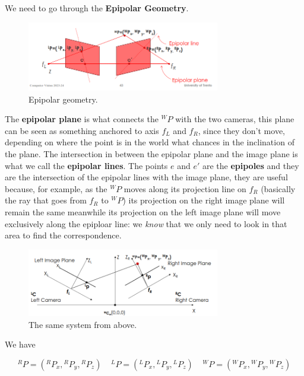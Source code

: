 We need to go through the \textbf{Epipolar Geometry}.

\begin{figure}[H]
    \centering
    \includegraphics[width=0.75\textwidth]{Figures/epipolar.png}
    \caption{Epipolar geometry.}
    \label{fig:epipolar}
\end{figure}

The \textbf{epipolar plane} is what connects the  \({}^WP\) with the two cameras, this plane can be seen as something anchored to axis \(f_L\) and \(f_R\), since they don't move, depending on where the point is in the world what chances in the inclination of the plane. The intersection in between the epipolar plane and the image plane is what we call the \textbf{epipolar lines}. The points \(e\) and \(e'\) are the \textbf{epipoles} and they are the intersection of the epipolar lines with the image plane, they are useful because, for example, as the \({}^WP\) moves along its projection line on \(f_R\) (basically the ray that goes from \(f_R\) to \({}^WP\)) its projection on the right image plane will remain the same meanwhile its projection on the left image plane will move exclusively along the epiploar line: we \textit{know} that we only need to look in that area to find the correspondence. 

\begin{figure}[H]
    \centering
    \includegraphics[width=0.75\textwidth]{Figures/epipolar_above.png}
    \caption{The same system from above.}
    \label{fig:epipolar_above}
\end{figure}

We have 


\[{}^RP = ({}^RP_x, {}^RP_y, {}^RP_z) \;\;\;\;
{}^LP = ({}^LP_x, {}^LP_y, {}^LP_z)\;\;\;\;
{}^WP = ({}^WP_x, {}^WP_y, {}^WP_z)\]


